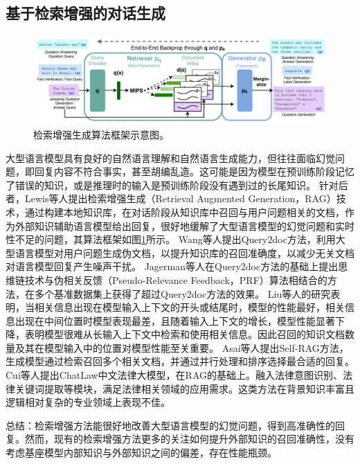 \subsection{基于检索增强的对话生成}

\begin{figure}[htbp]
	\centering
	\includegraphics[scale=0.48]{Fig/meta_rag_framework.png}
	\caption{\label{meta_rag_framework}检索增强生成算法框架示意图\cite{DBLP:conf/nips/LewisPPPKGKLYR020}。}
\end{figure}

大型语言模型具有良好的自然语言理解和自然语言生成能力，但往往面临幻觉问题，即回复内容不符合事实，甚至胡编乱造。这可能是因为模型在预训练阶段记忆了错误的知识，或是推理时的输入是预训练阶段没有遇到过的长尾知识。
针对后者，Lewis等人\cite{DBLP:conf/nips/LewisPPPKGKLYR020}提出检索增强生成（Retrieval Augmented Generation，RAG）技术，通过构建本地知识库，在对话阶段从知识库中召回与用户问题相关的文档，作为外部知识辅助语言模型给出回复，很好地缓解了大型语言模型的幻觉问题和实时性不足的问题，其算法框架如图\ref{meta_rag_framework}所示。
Wang等人\cite{DBLP:conf/emnlp/WangYW23}提出Query2doc方法，利用大型语言模型对用户问题生成伪文档，以提升知识库的召回准确度，以减少无关文档对语言模型回复产生噪声干扰。
Jagerman等人\cite{DBLP:journals/corr/abs-2305-03653}在Query2doc方法的基础上提出思维链技术与伪相关反馈（Pseudo-Relevance Feedback，PRF）算法相结合的方法，在多个基准数据集上获得了超过Query2doc方法的效果。
Liu等人\cite{DBLP:journals/corr/abs-2307-03172}的研究表明，当相关信息出现在模型输入上下文的开头或结尾时，模型的性能最好，相关信息出现在中间位置时模型表现最差，且随着输入上下文的增长，模型性能显著下降，表明模型很难从长输入上下文中检索和使用相关信息。因此召回的知识文档数量及其在模型输入中的位置对模型性能至关重要。
Asai等人\cite{DBLP:journals/corr/abs-2310-11511}提出Self-RAG方法，生成模型通过检索召回多个相关文档，并通过并行处理和排序选择最合适的回复。
Cui等人\cite{DBLP:journals/corr/abs-2306-16092}提出ChatLaw中文法律大模型，在RAG的基础上。融入法律意图识别、法律关键词提取等模块，满足法律相关领域的应用需求。这类方法在背景知识丰富且逻辑相对复杂的专业领域上表现不佳。

总结：检索增强方法能很好地改善大型语言模型的幻觉问题，得到高准确性的回复。然而，现有的检索增强方法更多的关注如何提升外部知识的召回准确性，没有考虑基座模型内部知识与外部知识之间的偏差，存在性能瓶颈。


